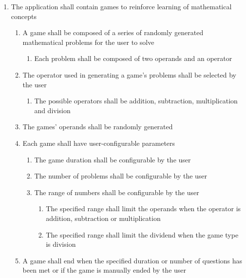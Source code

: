 \documentclass[12pt,letterpaper,oneside]{article}
\begin{document}
\begin{enumerate}
	\item	%
		The application shall contain games to reinforce learning of mathematical concepts
		\begin{enumerate}
			\item	%
				A game shall be composed of a series of randomly generated mathematical problems for the user to solve
				\begin{enumerate}
					\item %
						Each problem shall be composed of two operands and an operator
				\end{enumerate}
			\item	%
				The operator used in generating a game's problems shall be selected by the user
				\begin{enumerate}
					\item %
						The possible operators shall be addition, subtraction, multiplication and division
				\end{enumerate}
			\item	%
				The games' operands shall be randomly generated
			\item	%
				Each game shall have user-configurable parameters
				\begin{enumerate}
					\item	%
						The game duration shall be configurable by the user
					\item	%
						The number of problems shall be configurable by the user
					\item	%
						The range of numbers shall be configurable by the user
						\begin{enumerate}
							\item %
								The specified range shall limit the operands when the operator is addition, subtraction or multiplication
							\item %
								The specified range shall limit the dividend when the game type is division
						\end{enumerate}
				\end{enumerate}
			\item	%
				A game shall end when the specified duration or number of questions has been met or if the game is manually ended by the user
		\end{enumerate}


\end{enumerate}
\end{document}
